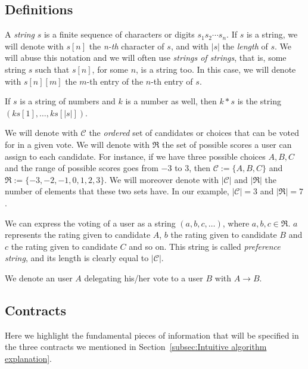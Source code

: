 \documentclass[submission, copyright,creativecommons,sharealike,noncommercial]{eptcs}
\newcommand{\candidates}{\ensuremath{\mathcal{C}} \xspace}
\newcommand{\range}{\ensuremath{\mathfrak{R}}\xspace}
\begin{document}
\subsection{Definitions}\label{subsec:Definitions}
%
	\begin{definition}
		A \emph{string} $s$ is a finite sequence of characters or digits $s_1 s_2 \cdots s_n$. If $s$ is a string, we will denote with $s[n]$ the \emph{n-th} character of $s$, and with $|s|$ the \emph{length} of $s$. We will abuse this notation and we will often use \emph{strings of strings}, that is, some string $s$ such that $s[n]$, for some $n$, is a string too. In this case, we will denote with $s[n][m]$ the $m$-th entry of the $n$-th entry of $s$.
		
		If $s$ is a string of numbers and $k$ is a number as well, then $k*s$ is the string $(ks[1], \dots, ks[|s|])$.
	\end{definition}	
%	
	\begin{definition}\label{def:candidates and range}
		We will denote with \candidates the \emph{ordered} set of candidates or choices that can be voted for in a given vote. We will denote with \range the set of possible scores a user can assign to each candidate. For instance, if we have three possible choices $A,B,C$ and the range of possible scores goes from $-3$ to $3$, then $\candidates := \{A, B, C\}$ and $\range := \{-3,-2,-1,0,1,2,3\}$. We will moreover denote with $| \candidates|$ and $|\range|$ the number of elements that these two sets have. In our example, $|\candidates | = 3$ and $|\range|=7$.
	\end{definition}
%	
	\begin{definition}\label{def:voting string}		
		We can express the voting of a user as a string $(a,b,c, \dots)$, where $a,b,c \in \range$. $a$ represents the rating given to candidate $A$, $b$ the rating given to candidate $B$ and $c$ the rating given to candidate $C$ and so on. This string is called \emph{preference string}, and its length is clearly equal to $|\candidates|$.
	\end{definition}
%
	\begin{definition}
 		We denote an user $A$ delegating his/her vote to a user $B$ with $A \to B$.
	\end{definition}
%
%
\subsection{Contracts}\label{subsec:Contracts}
%
Here we highlight the fundamental pieces of information that will be specified in the three contracts we mentioned in Section~\ref{subsec:Intuitive algorithm explanation}.
\end{document}
